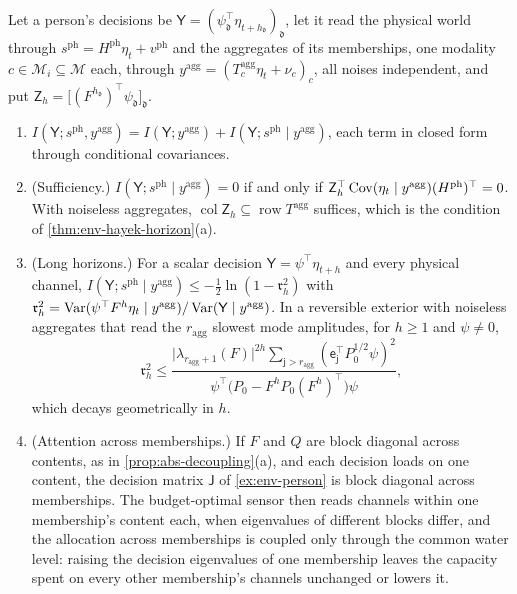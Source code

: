 \begin{proposition}\label{prop:env-multiplex}
Let a person's decisions be $\mathsf Y=(\psi_{\mathfrak d}^\top\eta_{t+h_{\mathfrak d}})_{\mathfrak d}$, let it read the physical world through $s^{\mathrm{ph}}=H^{\mathrm{ph}}\eta_t+v^{\mathrm{ph}}$ and the aggregates of its memberships, one modality $c\in\mathcal M_i\subseteq\mathcal M$ each, through $y^{\mathrm{agg}}=(T^{\mathrm{agg}}_c\eta_t+\nu_c)_c$, all noises independent, and put $\mathsf Z_h=\bigl[(F^{h_{\mathfrak d}})^\top\psi_{\mathfrak d}\bigr]_{\mathfrak d}$.
\begin{enumerate}
\item[(a)] $I(\mathsf Y;s^{\mathrm{ph}},y^{\mathrm{agg}})=I(\mathsf Y;y^{\mathrm{agg}})+I(\mathsf Y;s^{\mathrm{ph}}\mid y^{\mathrm{agg}})$, each term in closed form through conditional covariances.
\item[(b)] (Sufficiency.) $I(\mathsf Y;s^{\mathrm{ph}}\mid y^{\mathrm{agg}})=0$ if and only if $\mathsf Z_h^\top\operatorname{Cov}(\eta_t\mid y^{\mathrm{agg}})(H^{\mathrm{ph}})^\top=0$. With noiseless aggregates, $\operatorname{col}\mathsf Z_h\subseteq\operatorname{row}T^{\mathrm{agg}}$ suffices, which is the condition of \cref{thm:env-hayek-horizon}(a).
\item[(c)] (Long horizons.) For a scalar decision $\mathsf Y=\psi^\top\eta_{t+h}$ and every physical channel, $I(\mathsf Y;s^{\mathrm{ph}}\mid y^{\mathrm{agg}})\le-\frac12\ln(1-\mathfrak r_h^2)$ with $\mathfrak r_h^2=\operatorname{Var}(\psi^\top F^h\eta_t\mid y^{\mathrm{agg}})/\operatorname{Var}(\mathsf Y\mid y^{\mathrm{agg}})$. In a reversible exterior with noiseless aggregates that read the $r_{\mathrm{agg}}$ slowest mode amplitudes, for $h\ge1$ and $\psi\ne0$,
\[
\mathfrak r_h^2\le\frac{\lvert\lambda_{r_{\mathrm{agg}}+1}(F)\rvert^{2h}\sum_{\mathsf j>r_{\mathrm{agg}}}(\mathsf e_{\mathsf j}^\top P_0^{1/2}\psi)^2}{\psi^\top\bigl(P_0-F^hP_0(F^h)^\top\bigr)\psi},
\]
which decays geometrically in $h$.
\item[(d)] (Attention across memberships.) If $F$ and $Q$ are block diagonal across contents, as in \cref{prop:abs-decoupling}(a), and each decision loads on one content, the decision matrix $\mathsf J$ of \cref{ex:env-person} is block diagonal across memberships. The budget-optimal sensor then reads channels within one membership's content each, when eigenvalues of different blocks differ, and the allocation across memberships is coupled only through the common water level: raising the decision eigenvalues of one membership leaves the capacity spent on every other membership's channels unchanged or lowers it.
\end{enumerate}
\end{proposition}

